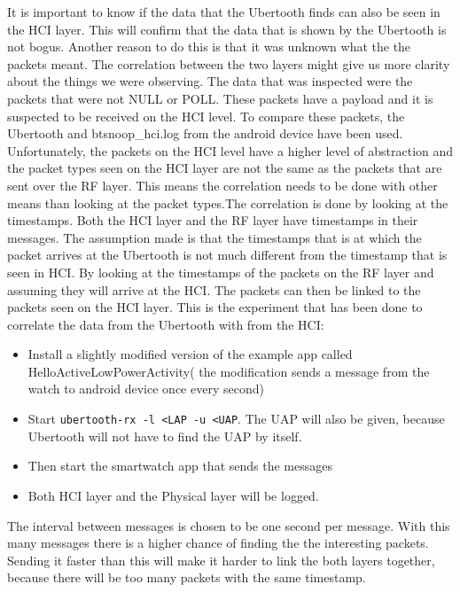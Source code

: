 It is important to know if the data that the Ubertooth finds can also be seen in the HCI layer. This will confirm that the data that is shown by the Ubertooth is not bogus. Another reason to do this is that it was unknown what the the packets meant. The correlation between the two layers might give us more clarity about the things we were observing. \pend The data that was inspected were the packets that were not NULL or POLL. These packets have a payload and it is suspected to be received on the HCI level. To compare these packets, the Ubertooth and btsnoop\_hci.log from the android device have been used. Unfortunately, the packets on the HCI level have a higher level of abstraction and the packet types seen on the HCI layer are not the same as the packets that are sent over the RF layer. This means the correlation needs to be done with other means than looking at the packet types.\pend The correlation is done by looking at the timestamps. Both the HCI layer and the RF layer have timestamps in their messages. The assumption made is that the timestamps that is at which the packet arrives at the Ubertooth is not much different from the timestamp that is seen in HCI. By looking at the timestamps of the packets on the RF layer and assuming they will arrive at the HCI. The packets can then be linked to the packets seen on the HCI layer. \pend
This is the experiment that has been done to correlate the data from the Ubertooth with from the HCI:
\begin{itemize}
\item Install a slightly modified version of the example app called HelloActiveLowPowerActivity( the modification sends a message from the watch to android device once every second)
\item Start \verb|ubertooth-rx -l <LAP -u <UAP|. The UAP will also be given, because Ubertooth will not have to find the UAP by itself. 
\item Then start the smartwatch app that sends the messages
\item Both HCI layer and the Physical layer will be logged.
\end{itemize}
The interval between messages is chosen to be one second per message. With this many messages there is a higher chance of finding the the interesting packets. Sending it faster than this will make it harder to link the both layers together, because there will be too many packets with the same timestamp.